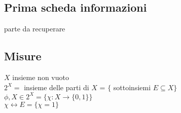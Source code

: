 \documentclass{article}
\begin{document}
\maketitle
	\newpage
	\subsection{Prima scheda informazioni}
	parte da recuperare\\
	\subsection{Misure}
	$X$ insieme non vuoto\\
	$2^X = $  insieme delle parti di  $X$ =  $\{$ sottoinsiemi $E\subseteq X\}$\\
	$\phi,X\in 2^X = \{\chi:X \rightarrow\{0,1\}\}$\\
	$\chi \leftrightarrow E = \{\chi = 1\}$\\
\end{document}
